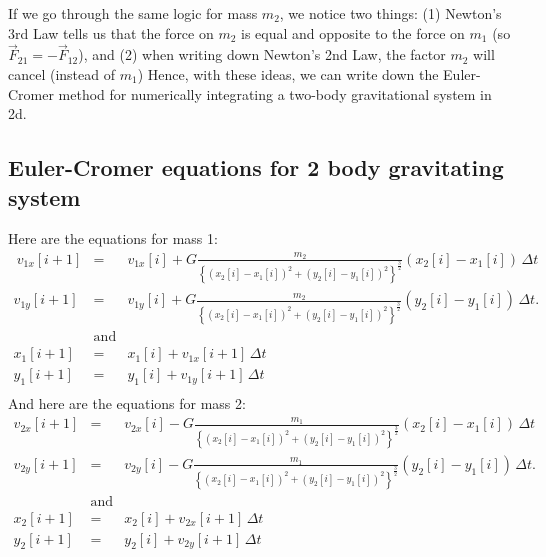 If we go through the same logic for mass $m_2$, we notice two things: (1) Newton's 3rd Law tells us that the force on $m_2$ is equal and opposite to the force on $m_1$ (so $\vec{F}_{21} = - \vec{F}_{12}$), and (2) when writing down Newton's 2nd Law, the factor $m_2$ will cancel (instead of $m_1$) Hence, with these ideas, we can write down the Euler-Cromer method for numerically integrating a two-body gravitational system in 2d.

\subsection{Euler-Cromer equations for 2 body gravitating system}
Here are the equations for mass 1:
\begin{eqnarray}\
v_{1x}[i+1] & = & v_{1x}[i] + G\frac{m_2}{\left\{(x_2[i] - x_1[i])^2 + (y_2[i] - y_1[i])^2\right\}^\frac{3}{2} }(x_2[i] - x_1[i]) \,\Delta t \nonumber \\
v_{1y}[i+1] & = & v_{1y}[i] + G\frac{m_2}{\left\{(x_2[i] - x_1[i])^2 + (y_2[i] - y_1[i])^2\right\}^\frac{3}{2} }(y_2[i] - y_1[i]) \,\Delta t. \nonumber \\[2mm]
& \mathrm{and} & \nonumber \\[2mm]
x_1[i+1] & = & x_1[i] + v_{1x}[i+1]\,\Delta t \nonumber \\
y_1[i+1] & = & y_1[i] + v_{1y}[i+1]\,\Delta t \nonumber \\
\label{eq:EC_gravity_body1}
\end{eqnarray}
And here are the equations for mass 2:
\begin{eqnarray}
v_{2x}[i+1] & = & v_{2x}[i] - G\frac{m_1}{\left\{(x_2[i] - x_1[i])^2 + (y_2[i] - y_1[i])^2\right\}^\frac{3}{2} }(x_2[i] - x_1[i]) \,\Delta t \nonumber \\
v_{2y}[i+1] & = & v_{2y}[i] - G\frac{m_1}{\left\{(x_2[i] - x_1[i])^2 + (y_2[i] - y_1[i])^2\right\}^\frac{3}{2} }(y_2[i] - y_1[i])\, \Delta t.\nonumber \\[2mm]
& \mathrm{and} &\nonumber \\[2mm]
x_2[i+1] & = & x_2[i] + v_{2x}[i+1]\,\Delta t\nonumber \\
y_2[i+1] & = & y_2[i] + v_{2y}[i+1]\,\Delta t\nonumber \\
\label{eq:EC_gravity_body2}
\end{eqnarray}

